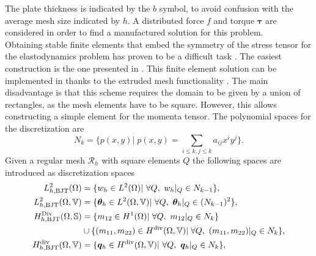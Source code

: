 The plate thickness is indicated by the $b$ symbol, to avoid confusion with the average mesh size indicated by $h$. A distributed force $f$ and torque $\bm{\tau}$ are considered in order to find a manufactured solution for this problem. \\

Obtaining stable finite elements that embed the symmetry of the stress tensor for the elastodynamics problem has proven to be a difficult task \cite{arnold2002mixed}. The easiest construction is the one presented in \cite{becache2001elas}. This finite element solution can be implemented in {} \cite{rathgeber2017firedrake} thanks to the extruded mesh functionality \cite{mcrae2016}.  The main disadvantage is that this scheme requires the domain to be given by a union of rectangles, as the mesh elements have to be square. However, this allows constructing a simple element for the momenta tensor. The polynomial spaces for the discretization are
\[
N_{k} = \{p(x, y)| \; p(x, y) = \sum_{i\le k, j\le k} a_{ij} x^i y^j  \}.
\]
Given a regular mesh $\mathcal{R}_h$ with square elements $Q$ the following spaces are introduced as discretization spaces
\begin{equation}
\label{eq:BTJ}
\begin{aligned}
L_{h, \text{BJT}}^2(\Omega) &= \{w_h \in L^2(\Omega) | \ \forall Q, \ w_h|_{Q} \in N_{k-1} \}, \\
L_{h, \text{BJT}}^2(\Omega, \mathbb{V}) &= \{\bm{\theta}_h \in L^2(\Omega, \mathbb{V}) | \ \forall Q,\ \bm{\theta}_h|_{Q} \in (N_{k-1})^2 \}, \\
H_{h, \text{BJT}}^{\operatorname*{Div}}(\Omega, \mathbb{S}) &= \{m_{12} \in H^1(\Omega)| \ \forall Q,\ m_{12}|_{Q} \in N_{k} \}  \\
&\cup \{(m_{11}, m_{22}) \in H^{\operatorname{div}}(\Omega, \mathbb{V})| \; \forall Q,\ (m_{11}, m_{22})|_{Q} \in N_{k} \}, \\
H_{h, \text{BJT}}^{\operatorname{div}}(\Omega, \mathbb{V}) &= \{\bm{q}_h \in H^{\operatorname{div}}(\Omega, \mathbb{V}) | \ \forall Q,\ \bm{q}_h|_{Q} \in N_{k} \}, \\ 
\end{aligned}
\end{equation}

